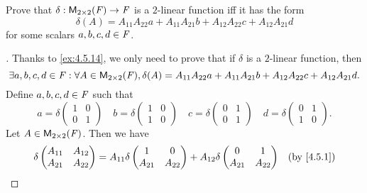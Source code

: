\begin{ex}\label{ex:4.5.15}
  Prove that \(\delta : \ms[2][2][\F] \to \F\) is a \(2\)-linear function iff it has the form
  \[
    \delta(A) = A_{1 1} A_{2 2} a + A_{1 1} A_{2 1} b + A_{1 2} A_{2 2} c + A_{1 2} A_{2 1} d
  \]
  for some scalars \(a, b, c, d \in \mathit{F}\).
\end{ex}

\begin{proof}[]
  Thanks to \cref{ex:4.5.14}, we only need to prove that if \(\delta\) is a \(2\)-linear function, then
  \[
    \exists a, b, c, d \in \F : \forall A \in \ms[2][2][\F], \delta(A) = A_{1 1} A_{2 2} a + A_{1 1} A_{2 1} b + A_{1 2} A_{2 2} c + A_{1 2} A_{2 1} d.
  \]
  Define \(a, b, c, d \in \mathit{F}\) such that
  \[
    a = \delta\begin{pmatrix}
      1 & 0 \\
      0 & 1
    \end{pmatrix} \quad b = \delta\begin{pmatrix}
      1 & 0 \\
      1 & 0
    \end{pmatrix} \quad c = \delta\begin{pmatrix}
      0 & 1 \\
      0 & 1
    \end{pmatrix} \quad d = \delta\begin{pmatrix}
      0 & 1 \\
      1 & 0
    \end{pmatrix}.
  \]
  Let \(A \in \ms[2][2][\F]\).
  Then we have
  \begin{align*}
    \delta\begin{pmatrix}
            A_{1 1} & A_{1 2} \\
            A_{2 1} & A_{2 2}
          \end{pmatrix} & = A_{1 1} \delta\begin{pmatrix}
                                            1       & 0       \\
                                            A_{2 1} & A_{2 2}
                                          \end{pmatrix} + A_{1 2} \delta\begin{pmatrix}
                                                                          0       & 1       \\
                                                                          A_{2 1} & A_{2 2}
                                                                        \end{pmatrix}                                    &  & \by{4.5.1}                 \\

\end{align*}
\end{proof}
